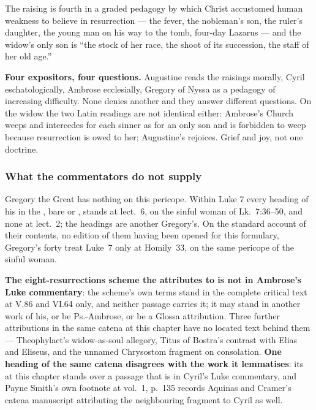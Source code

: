 \begin{witnessnote}
 The raising is fourth in a graded pedagogy by which Christ
accustomed human weakness to believe in resurrection --- the fever,
the nobleman's son, the ruler's daughter, the young man on his way to the tomb,
four-day Lazarus --- and the widow's only son is ``the stock of her race, the shoot
of its succession, the staff of her old age.''
\end{witnessnote}

\textbf{Four expositors, four questions.} Augustine reads the raisings morally,
Cyril eschatologically, Ambrose ecclesially, Gregory of Nyssa as a pedagogy of
increasing difficulty. None denies another and they answer different questions.
On the widow the two Latin readings are not identical
either: Ambrose's Church weeps and intercedes for each sinner as for an only son
and is forbidden to weep because resurrection is owed to her; Augustine's
rejoices. Grief and joy, not one doctrine.

\subsubsection*{What the commentators do not supply}

Gregory the Great has nothing on this pericope. Within Luke 7 every heading of
his in the , bare  or , stands at lect.~6, on the sinful woman of Lk.\ 7:36--50, and none at
lect.~2; the  headings are another Gregory's. On the
standard account of their contents, no edition of
them having been opened for this formulary, Gregory's forty  treat Luke~7 only at Homily~33, on the same pericope of the sinful
woman.

\textbf{The eight-resurrections scheme the  attributes to
 is not in Ambrose's Luke commentary}: the scheme's own terms
stand in the complete critical text at V.86 and VI.64 only, and neither passage
carries it; it may stand in another work of his, or be Ps.-Ambrose,
or be a Glossa attribution. Three further attributions in the same catena at this chapter have no
located text behind them --- Theophylact's widow-as-soul allegory, Titus of
Bostra's contrast with Elias and Eliseus, and the unnamed Chrysostom fragment on
consolation. \textbf{One heading of the same catena disagrees with the work it
lemmatises}: its  at this chapter stands over a
passage that is in Cyril's Luke commentary, and Payne Smith's own footnote at
vol.~1, p.~135 records Aquinas and Cramer's catena manuscript attributing the
neighbouring fragment to Cyril as well.

